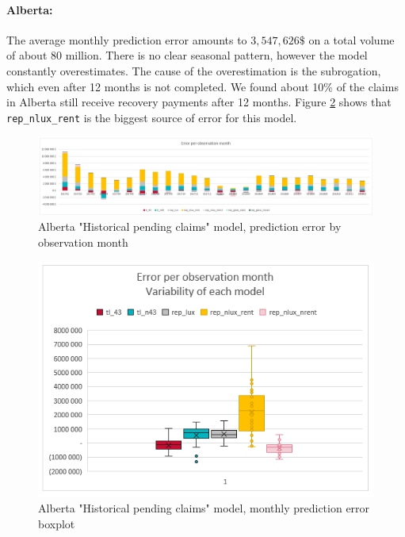 	\paragraph{Alberta:}
		The average monthly prediction error amounts to $3,547,626\$ $ on a total volume of about 80 million. There is no clear seasonal pattern, however the model constantly overestimates. The cause of the overestimation is the subrogation, which even after 12 months is not completed. We found about 10\% of the claims in Alberta still receive recovery payments after 12 months. Figure \ref{Fig_AB_current_er_boxplot} shows that \texttt{rep\_nlux\_rent} is the biggest source of error for this model.   
		\begin{figure}[H]
			\begin{center}
				\includegraphics[scale=0.4]{Graphiques/AB_current_model_by_month} 
				\renewcommand{\figurename}{Figure}
				\caption{Alberta "Historical  pending claims" model, prediction error by observation month}\label{Fig_AB_current_er_by_month}
			\end{center}
		\end{figure}
		\begin{figure}[H]
			\begin{center}
				\includegraphics[scale=0.4]{Graphiques/AB_current_model_mustach} 
				\renewcommand{\figurename}{Figure}
				\caption{Alberta "Historical  pending claims" model, monthly prediction error boxplot}\label{Fig_AB_current_er_boxplot}
			\end{center}
		\end{figure}
	
